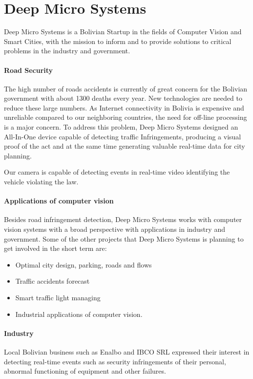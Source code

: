 \documentclass[fleqn,12pt]{SelfArx} %
\begin{document}
\section{Deep Micro Systems}

Deep Micro Systems is a Bolivian Startup in the fields of Computer Vision and Smart Cities, with the mission to inform and to provide solutions to critical problems in the industry and government. 

\paragraph{Road Security} The high number of roads accidents is currently of great concern for the Bolivian government with about 1300 deaths every year. New technologies are needed to reduce these large numbers. As Internet connectivity in Bolivia is expensive and unreliable compared to our neighboring countries, the need for off-line processing is a major concern. To address this problem,  Deep Micro Systems designed an All-In-One device capable of detecting traffic Infringements, producing a visual proof of the act and at the same time generating valuable real-time data for city planning.

Our camera is capable of detecting events in real-time video identifying the vehicle violating the law.

\paragraph{Applications of computer vision} Besides road infringement detection, Deep Micro Systems works with computer vision systems with a broad perspective with applications in industry and government. Some of the other projects that Deep Micro Systems is planning to get involved in the short term are:

\begin{itemize}[noitemsep] %
\item Optimal city design, parking, roads and flows
\item Traffic accidents forecast
\item Smart traffic light managing
\item Industrial applications of computer vision.
\end{itemize}

\paragraph{Industry} Local Bolivian business such as Enalbo and IBCO SRL expressed their interest in detecting real-time events such as security infringements
of their personal, abnormal functioning of equipment and other failures.
\end{document}
